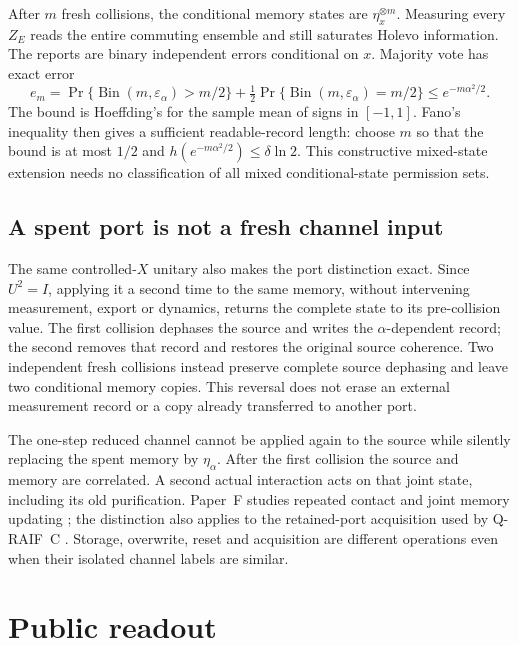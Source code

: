 \documentclass[12pt,a4paper]{article}
\begin{document}
After $m$ fresh collisions, the conditional memory states are
$\eta_x^{\otimes m}$. Measuring every $Z_E$ reads the entire
commuting ensemble and still saturates Holevo information.
The reports are binary independent errors conditional on $x$.
Majority vote has exact error
\begin{equation}\label{eq:mixed-majority}
 e_m=\Pr\{\operatorname{Bin}(m,\varepsilon_\alpha)>m/2\}
       +\tfrac12\Pr\{\operatorname{Bin}(m,\varepsilon_\alpha)=m/2\}
 \le e^{-m\alpha^2/2}.
\end{equation}
The bound is Hoeffding's for the sample mean of signs in $[-1,1]$.
Fano's inequality then gives a sufficient readable-record length:
choose $m$ so that the bound is at most $1/2$ and
$h(e^{-m\alpha^2/2})\le\delta\ln2$.
This constructive mixed-state extension needs no classification
of all mixed conditional-state permission sets.

\subsection{A spent port is not a fresh channel input}
\label{sec:spent}

The same controlled-$X$ unitary also makes the port distinction
exact. Since $U^2=I$, applying it a second time to the same memory,
without intervening measurement, export or dynamics, returns the
complete state to its pre-collision value.
The first collision dephases the source and writes the
$\alpha$-dependent record; the second removes that record and
restores the original source coherence. Two independent fresh
collisions instead preserve complete source dephasing and leave
two conditional memory copies. This reversal does not erase an
external measurement record or a copy already transferred to
another port.

The one-step reduced channel cannot be applied again to the
source while silently replacing the spent memory by $\eta_\alpha$.
After the first collision the source and memory are correlated.
A second actual interaction acts on that joint state, including
its old purification. Paper~F studies repeated contact and joint
memory updating \cite{Liu2026PaperF}; the distinction also applies
to the retained-port acquisition used by Q-RAIF~C
\cite{Liu2026QRAIFC}. Storage, overwrite, reset and acquisition
are different operations even when their isolated channel labels
are similar.

\section{Public readout}
\label{sec:public}
\end{document}
